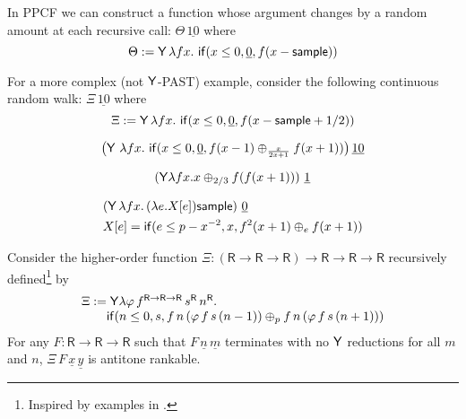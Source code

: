 \begin{example}\label{ex:raven complex}
In PPCF we can construct a function whose argument changes by a random amount at each recursive call: $\Theta \, \underline{10}$ where
\[
\Theta := \mathsf{Y} \, \lambda f x .\ \mathsf{if}(x \leq 0, \underline 0, f(x - \mathsf{sample}))
\]

For a more complex (not $\mathsf{Y}$-PAST) example, consider the following continuous random walk: $\Xi \, \underline{10}$ where
\[
\Xi := \mathsf{Y} \, \lambda f x .\ \mathsf{if}(x \leq 0, \underline 0, f(x - \mathsf{sample} + 1/2)) 
\]
\end{example}

\begin{example}
\label{ex:Fair-in-the-limit random walk}\cite[\S 5.3]{DBLP:journals/pacmpl/McIverMKK18}
\[
\big
(\tY\ \lambda f x .\ 
\tif{x \leq 0}{\underline 0}{f(x - 1) \oplus_{\frac{x}{2x+1}} f(x + 1)} \big)
\, \underline{10}
\]
\end{example}

\begin{example}
\label{ex:non-affine recursion easy}
\[
(\mathsf{Y} \lambda f x. x \oplus_{2/3} f (f (x + 1)))\ \underline 1
\]
\end{example}

\begin{example}
\label{ex:non-affine continuous}
\begin{align*}
& (\mathsf{Y}\, \lambda f x.\, (\lambda e. X[e]) \mathsf{sample})\ \underline 0 \\
& X[e] = \mathsf{if}(e \leq p - x^{-2}, x, f^2(x+1) \oplus_e f(x+1))
\end{align*}
\end{example}

\begin{example} \label{ex:higher-order recursion}
Consider the higher-order function
$\Xi : (\textsf{R} \to \textsf{R} \to \textsf{R}) \to \textsf{R} \to \textsf{R} \to \textsf{R}$
recursively defined\footnote{Inspired by examples in \cite{DBLP:journals/pacmpl/BurnOR18,DBLP:conf/lics/OngW19}.} by
\[
\begin{array}{l}
\Xi := \mathsf{Y} \lambda \varphi \, f^{\textsf{R} \to \textsf{R} \to \textsf{R}} \, s^\textsf{R} \, n^\textsf{R} . \\
\qquad\mathsf{if}(n \leq 0, s, 
f \, n \, (\varphi \, f \, s \, (n - 1))
\oplus_p
f \, n \, (\varphi \, f \, s \, (n + 1))
)
\end{array}
\]
For any $F : \textsf{R} \to \textsf{R} \to \textsf{R}$ such that $F\, \underline n\, \underline m$ terminates with no $\mathsf{Y}$ reductions for all $m$ and $n$, $\Xi\, F\, \underline x\, \underline y$ is antitone rankable.
\end{example}

